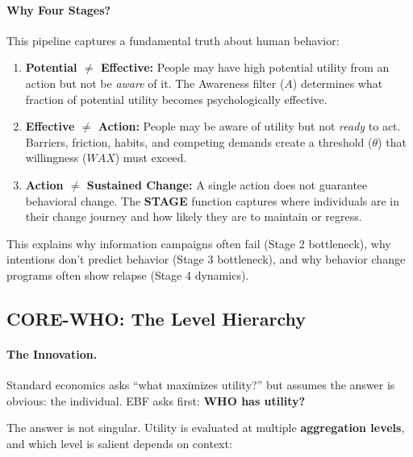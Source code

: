 \paragraph{Why Four Stages?}
This pipeline captures a fundamental truth about human behavior:

\begin{enumerate}
\item \textbf{Potential $\neq$ Effective:} People may have high potential utility
from an action but not be \emph{aware} of it. The Awareness filter ($A$)
determines what fraction of potential utility becomes psychologically effective.

\item \textbf{Effective $\neq$ Action:} People may be aware of utility but not
\emph{ready} to act. Barriers, friction, habits, and competing demands create
a threshold ($\theta$) that willingness ($WAX$) must exceed.

\item \textbf{Action $\neq$ Sustained Change:} A single action does not guarantee
behavioral change. The \textbf{STAGE} function captures where individuals are
in their change journey and how likely they are to maintain or regress.
\end{enumerate}

This explains why information campaigns often fail (Stage 2 bottleneck),
why intentions don't predict behavior (Stage 3 bottleneck), and why behavior
change programs often show relapse (Stage 4 dynamics).

\subsection{CORE-WHO: The Level Hierarchy}
\label{sec:10c-who}

\paragraph{The Innovation.}
Standard economics asks ``what maximizes utility?'' but assumes the answer is
obvious: the individual. EBF asks first: \textbf{WHO has utility?}

The answer is not singular. Utility is evaluated at multiple \textbf{aggregation
levels}, and which level is salient depends on context:

